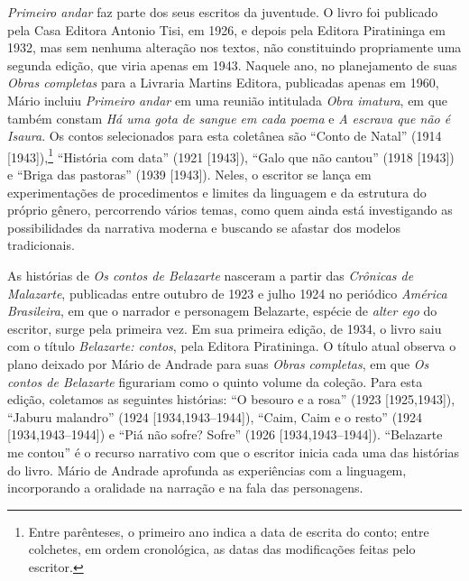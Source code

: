 \emph{Primeiro andar} faz parte dos seus escritos da juventude. O livro
foi publicado pela Casa Editora Antonio Tisi, em 1926, e depois pela
Editora Piratininga em 1932, mas sem nenhuma alteração nos textos, não
constituindo propriamente uma segunda edição, que viria apenas em 1943.
Naquele ano, no planejamento de suas \emph{Obras completas} para a
Livraria Martins Editora, publicadas apenas em 1960, Mário incluiu
\emph{Primeiro andar} em uma reunião intitulada \emph{Obra imatura}, em
que também constam \emph{Há uma gota de sangue em cada poema} e \emph{A
escrava que não é Isaura}. Os contos selecionados para esta coletânea
são ``Conto de Natal'' (1914 {[}1943{]}),\footnote{Entre parênteses, o
  primeiro ano indica a data de escrita do conto; entre colchetes, em
  ordem cronológica, as datas das modificações feitas pelo escritor.}
``História com data'' (1921 {[}1943{]}), ``Galo que não cantou'' (1918
{[}1943{]}) e ``Briga das pastoras'' (1939 {[}1943{]}). Neles, o
escritor se lança em experimentações de procedimentos e limites da
linguagem e da estrutura do próprio gênero, percorrendo vários temas,
como quem ainda está investigando as possibilidades da narrativa moderna
e buscando se afastar dos modelos tradicionais.

As histórias de \emph{Os contos de Belazarte} nasceram a partir das
\emph{Crônicas de Malazarte}, publicadas entre outubro de 1923 e julho
1924 no periódico \emph{América Brasileira}, em que o narrador e
personagem Belazarte, espécie de \emph{alter ego} do escritor, surge
pela primeira vez. Em sua primeira edição, de 1934, o livro saiu com o
título \emph{Belazarte: contos}, pela Editora Piratininga. O título
atual observa o plano deixado por Mário de Andrade para suas \emph{Obras
completas}, em que \emph{Os contos de Belazarte} figurariam como o
quinto volume da coleção. Para esta edição, coletamos as seguintes
histórias: ``O besouro e a rosa'' (1923 {[}1925,1943{]}), ``Jaburu
malandro'' (1924 {[}1934,1943--1944{]}), ``Caim, Caim e o resto'' (1924
{[}1934,1943--1944{]}) e ``Piá não sofre? Sofre'' (1926
{[}1934,1943--1944{]}). ``Belazarte me contou'' é o recurso narrativo com
que o escritor inicia cada uma das histórias do livro. Mário de Andrade
aprofunda as experiências com a linguagem, incorporando a oralidade na
narração e na fala das personagens.

